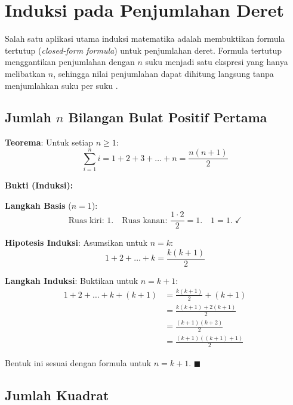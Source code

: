 \section{Induksi pada Penjumlahan Deret}

Salah satu aplikasi utama induksi matematika adalah membuktikan formula tertutup (\textit{closed-form formula}) untuk penjumlahan deret. Formula tertutup menggantikan penjumlahan dengan $n$ suku menjadi satu ekspresi yang hanya melibatkan $n$, sehingga nilai penjumlahan dapat dihitung langsung tanpa menjumlahkan suku per suku \cite{rosen2019}.

\subsection{Jumlah \texorpdfstring{$n$}{n} Bilangan Bulat Positif Pertama}

\begin{contoh}
\textbf{Teorema}: Untuk setiap $n \geq 1$:
\[ \sum_{i=1}^{n} i = 1 + 2 + 3 + \ldots + n = \frac{n(n+1)}{2} \]

\textbf{Bukti (Induksi):}

\textbf{Langkah Basis} ($n = 1$):
\[ \text{Ruas kiri: } 1. \quad \text{Ruas kanan: } \frac{1 \cdot 2}{2} = 1. \quad 1 = 1. \; \checkmark \]

\textbf{Hipotesis Induksi}: Asumsikan untuk $n = k$:
\[ 1 + 2 + \ldots + k = \frac{k(k+1)}{2} \]

\textbf{Langkah Induksi}: Buktikan untuk $n = k + 1$:
\begin{align*}
1 + 2 + \ldots + k + (k+1) &= \frac{k(k+1)}{2} + (k+1) \\
&= \frac{k(k+1) + 2(k+1)}{2} \\
&= \frac{(k+1)(k+2)}{2} \\
&= \frac{(k+1)((k+1)+1)}{2}
\end{align*}

Bentuk ini sesuai dengan formula untuk $n = k + 1$. $\blacksquare$
\end{contoh}

\subsection{Jumlah Kuadrat}

